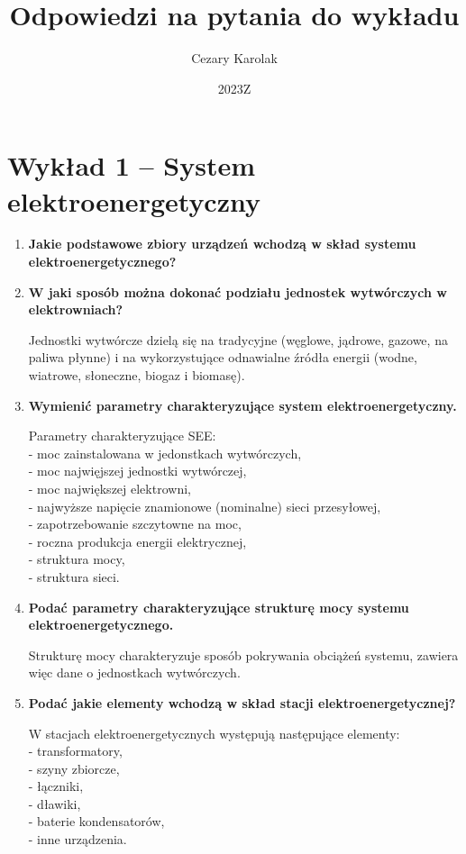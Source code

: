 \documentclass[12pt]{article}
\title{Odpowiedzi na pytania do wykładu}
\author{Cezary Karolak}
\date{2023Z}
\newcommand{\pytanie}[1]{\item \textbf{#1}}
\begin{document}
\maketitle
\tableofcontents
\newpage

\section{Wykład 1 -- System elektroenergetyczny}
\begin{enumerate}
    \pytanie{Jakie podstawowe zbiory urządzeń wchodzą w skład systemu elektroenergetycznego?}
    
    \pytanie{W jaki sposób można dokonać podziału jednostek wytwórczych w elektrowniach?}
    
        Jednostki wytwórcze dzielą się na tradycyjne (węglowe, jądrowe, gazowe, na paliwa płynne) 
        i na wykorzystujące odnawialne źródła energii (wodne, wiatrowe, słoneczne, biogaz i biomasę).

    \pytanie{Wymienić parametry charakteryzujące system elektroenergetyczny.}
    
        Parametry charakteryzujące SEE:\\
        - moc zainstalowana w jedonstkach wytwórczych,\\
        - moc najwięjszej jednostki wytwórczej,\\
        - moc największej elektrowni,\\
        - najwyższe napięcie znamionowe (nominalne) sieci przesyłowej,\\
        - zapotrzebowanie szczytowne na moc,\\
        - roczna produkcja energii elektrycznej,\\
        - struktura mocy,\\
        - struktura sieci.

    \pytanie{Podać parametry charakteryzujące strukturę mocy systemu elektroenergetycznego.}
    
        Strukturę mocy charakteryzuje sposób pokrywania obciążeń systemu, zawiera więc dane o jednostkach wytwórczych.

    \pytanie{Podać jakie elementy wchodzą w skład stacji elektroenergetycznej?}
    
        W stacjach elektroenergetycznych występują następujące elementy:\\
        - transformatory,\\
        - szyny zbiorcze,\\
        - łączniki,\\
        - dławiki,\\
        - baterie kondensatorów,\\
        - inne urządzenia.


\end{enumerate}
\end{document}
